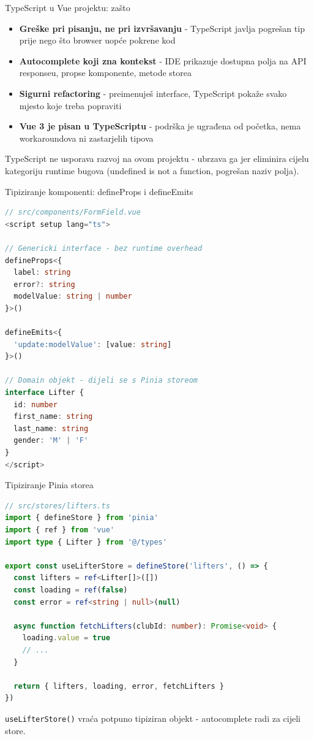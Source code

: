 \begin{frame}{TypeScript u Vue projektu: zašto}
\begin{itemize}
  \item \textbf{Greške pri pisanju, ne pri izvršavanju} - TypeScript javlja pogrešan tip prije nego što browser uopće pokrene kod
  \item \textbf{Autocomplete koji zna kontekst} - IDE prikazuje dostupna polja na API responseu, propse komponente, metode storea
  \item \textbf{Sigurni refactoring} - preimenuješ interface, TypeScript pokaže svako mjesto koje treba popraviti
  \item \textbf{Vue 3 je pisan u TypeScriptu} - podrška je ugrađena od početka, nema workaroundova ni zastarjelih tipova
\end{itemize}

\vspace{0.6em}
TypeScript ne usporava razvoj na ovom projektu - ubrzava ga jer eliminira cijelu kategoriju runtime bugova (undefined is not a function, pogrešan naziv polja).
\end{frame}

\begin{frame}[fragile,shrink=5]{Tipiziranje komponenti: defineProps i defineEmits}
\begin{lstlisting}[language=typescript]
// src/components/FormField.vue
<script setup lang="ts">

// Genericki interface - bez runtime overhead
defineProps<{
  label: string
  error?: string
  modelValue: string | number
}>()

defineEmits<{
  'update:modelValue': [value: string]
}>()

// Domain objekt - dijeli se s Pinia storeom
interface Lifter {
  id: number
  first_name: string
  last_name: string
  gender: 'M' | 'F'
}
</script>
\end{lstlisting}
\end{frame}

\begin{frame}[fragile,shrink=5]{Tipiziranje Pinia storea}
\begin{lstlisting}[language=typescript]
// src/stores/lifters.ts
import { defineStore } from 'pinia'
import { ref } from 'vue'
import type { Lifter } from '@/types'

export const useLifterStore = defineStore('lifters', () => {
  const lifters = ref<Lifter[]>([])
  const loading = ref(false)
  const error = ref<string | null>(null)

  async function fetchLifters(clubId: number): Promise<void> {
    loading.value = true
    // ...
  }

  return { lifters, loading, error, fetchLifters }
})
\end{lstlisting}

\vspace{0.4em}
\texttt{useLifterStore()} vraća potpuno tipiziran objekt - autocomplete radi za cijeli store.
\end{frame}

